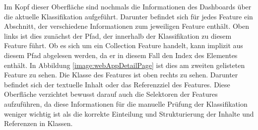     Im Kopf dieser Oberfläche sind nochmals die Informationen
    des Dashboards über die aktuelle Klassifikation aufgeführt.
    Darunter befindet sich für jedes Feature ein Abschnitt,
    der verschiedene Informationen zum jeweiligen Feature enthält.
    Oben links ist dies zunächst der Pfad,
    der innerhalb der Klassifikation zu diesem Feature führt.
    Ob es sich um ein Collection Feature handelt,
    kann implizit aus diesem Pfad abgelesen werden,
    da er in diesem Fall den Index des Elementes enthält.
    In Abbildung \ref{image:webAppDetailPage} ist dies am zweiten gelisteten Feature zu sehen.
    Die Klasse des Features ist oben rechts zu sehen.
    Darunter befindet sich der textuelle Inhalt oder das Referenzziel
    des Features.
    Diese Oberfläche verzichtet bewusst darauf auch die Selektoren der Features aufzuführen,
    da diese Informationen für die manuelle Prüfung der Klassifikation weniger wichtig ist
    als die korrekte Einteilung und Strukturierung der Inhalte und Referenzen in Klassen.
